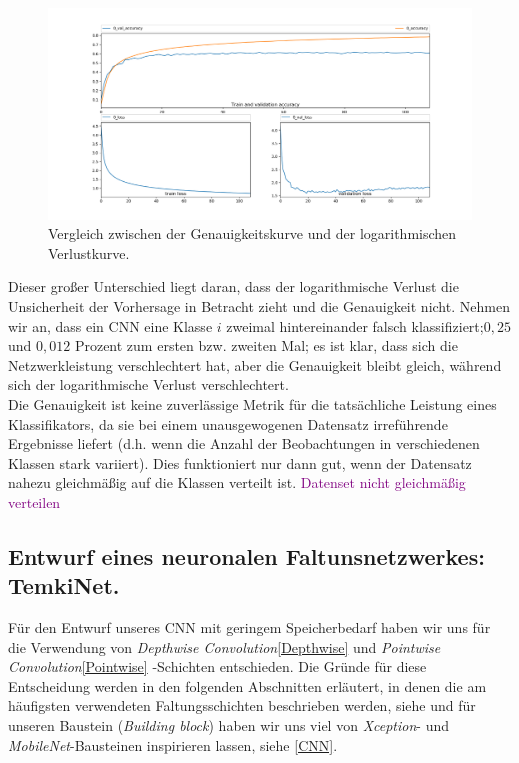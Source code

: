 \documentclass[12pt,a4paper]{scrartcl}
\numberwithin{equation}{section}
\begin{document}
\begin{figure}[h]
	\includegraphics[width=\textwidth]{accVSlogLoss}
	\caption{Vergleich zwischen der Genauigkeitskurve und der logarithmischen Verlustkurve. }
	\label{fig:accVSlogLoss}
\end{figure}

Dieser großer Unterschied liegt daran, dass der logarithmische Verlust die Unsicherheit der Vorhersage in Betracht zieht und die Genauigkeit nicht. Nehmen wir an, dass ein \ac{CNN} eine Klasse $ i $ zweimal hintereinander falsch klassifiziert;$ 0,25 $ und $ 0,012 $ Prozent zum ersten bzw. zweiten Mal; es ist klar, dass sich die Netzwerkleistung verschlechtert hat, aber die Genauigkeit bleibt gleich, während sich der logarithmische Verlust verschlechtert. \\

 Die Genauigkeit ist keine zuverlässige Metrik für die tatsächliche Leistung eines Klassifikators, da sie bei einem unausgewogenen Datensatz irreführende Ergebnisse liefert (d.h. wenn die Anzahl der Beobachtungen in verschiedenen Klassen stark variiert).
Dies funktioniert nur dann gut, wenn der Datensatz nahezu gleichmäßig auf die Klassen verteilt ist.
\textcolor{purple}{Datenset nicht gleichmäßig verteilen}

\subsection{Entwurf eines neuronalen Faltunsnetzwerkes: TemkiNet.}
Für den Entwurf unseres \ac{CNN} mit geringem Speicherbedarf haben wir uns für die Verwendung von \textit{Depthwise Convolution}\ref{Depthwise} und \textit{Pointwise Convolution}\ref{Pointwise} -Schichten entschieden. Die Gründe für diese Entscheidung werden in den folgenden Abschnitten erläutert, in denen die am häufigsten verwendeten Faltungsschichten beschrieben werden, siehe und für unseren Baustein (\textit{Building block}) haben wir uns viel von \textit{Xception}- und \textit{MobileNet}-Bausteinen inspirieren lassen, siehe \ref{CNN}. 
\end{document}
